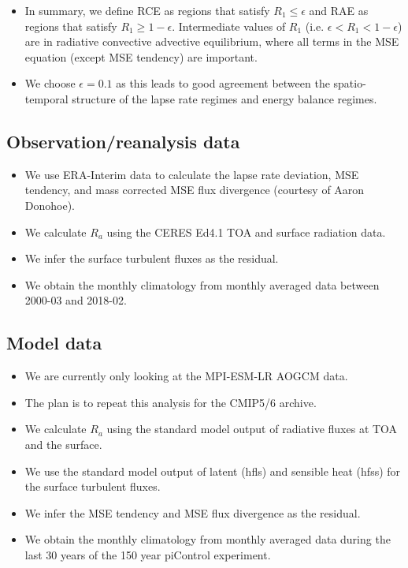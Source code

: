 \documentclass{ametsocV5}
\begin{document}
\begin{itemize}
  \item In summary, we define RCE as regions that satisfy \(R_{1}\le\epsilon\) and RAE as regions that satisfy \(R_{1}\ge 1-\epsilon\). Intermediate values of \(R_{1}\) (i.e. \(\epsilon < R_{1} < 1-\epsilon\)) are in radiative convective advective equilibrium, where all terms in the MSE equation (except MSE tendency) are important.
  \item We choose \(\epsilon=0.1\) as this leads to good agreement between the spatio-temporal structure of the lapse rate regimes and energy balance regimes.
\end{itemize}

\subsection{Observation/reanalysis data}
\begin{itemize}
  \item We use ERA-Interim data to calculate the lapse rate deviation, MSE tendency, and mass corrected MSE flux divergence (courtesy of Aaron Donohoe).
  \item We calculate \(R_{a}\) using the CERES Ed4.1 TOA and surface radiation data.
  \item We infer the surface turbulent fluxes as the residual.
  \item We obtain the monthly climatology from monthly averaged data between 2000-03 and 2018-02.
\end{itemize}

\subsection{Model data}
\begin{itemize}
  \item We are currently only looking at the MPI-ESM-LR AOGCM data.
  \item The plan is to repeat this analysis for the CMIP5/6 archive.
  \item We calculate \(R_{a}\) using the standard model output of radiative fluxes at TOA and the surface.
  \item We use the standard model output of latent (hfls) and sensible heat (hfss) for the surface turbulent fluxes.
  \item We infer the MSE tendency and MSE flux divergence as the residual.
  \item We obtain the monthly climatology from monthly averaged data during the last 30 years of the 150 year piControl experiment.
\end{itemize}
\end{document}
